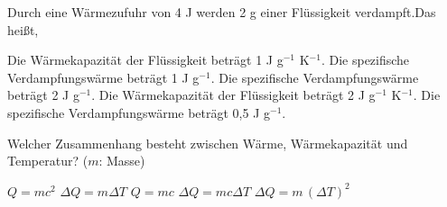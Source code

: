 \documentclass[11pt]{exam}
\begin{document}
\begin{questions}
\vspace{3mm}\question Durch eine Wärmezufuhr von 4 J werden 2 g einer Flüssigkeit verdampft.Das heißt,

\begin{choices}
	\choice Die Wärmekapazität der Flüssigkeit beträgt 1 J g\(^{-1}\) K\(^{-1}\).
	\choice Die spezifische Verdampfungswärme beträgt 1 J g\(^{-1}\).
	\choice Die spezifische Verdampfungswärme beträgt 2 J g\(^{-1}\).
	\choice Die Wärmekapazität der Flüssigkeit beträgt 2 J g\(^{-1}\) K\(^{-1}\).
	\choice Die spezifische Verdampfungswärme beträgt 0,5 J g\(^{-1}\).
\end{choices}

\vspace{3mm}\question Welcher Zusammenhang besteht zwischen Wärme, Wärmekapazität und Temperatur? (\(m\): Masse)

\begin{choices}
	\choice \(Q = m c^2\)
	\choice \(\Delta Q = m \Delta T\)
	\choice \(Q = m c\)
	\choice \(\Delta Q = m c \Delta T\)
	\choice \(\Delta Q = m \, (\Delta T)^2\)
\end{choices}

\vspace{3mm}\end{questions}
\end{document}
